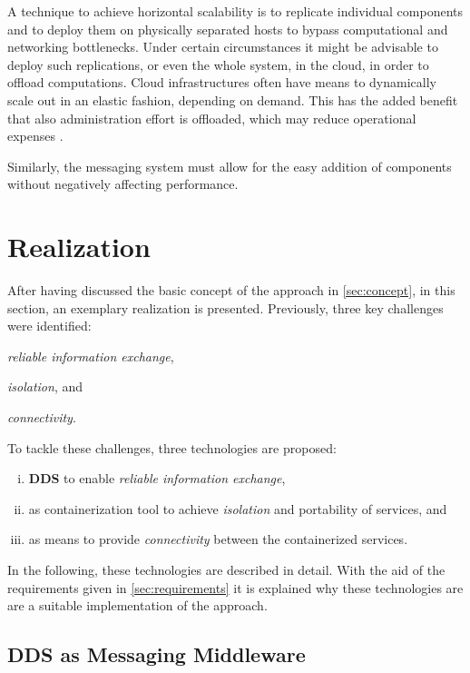A technique to achieve horizontal scalability is to replicate individual components and to deploy them on physically separated hosts to bypass computational and networking bottlenecks. Under certain circumstances it might be advisable to deploy such replications, or even the whole system, in the cloud, in order to offload computations. Cloud infrastructures often have means to dynamically scale out in an elastic fashion, depending on demand. This has the added benefit that also administration effort is offloaded, which may reduce operational expenses \cite{vaquero2011dynamically}.

Similarly, the messaging system must allow for the easy addition of components without negatively affecting performance.

%
%
%
%
%
%
%
%
%
%

\section{Realization} \label{sec:realization}
After having discussed the basic concept of the approach in \autoref{sec:concept}, in this section, an exemplary realization is presented. Previously, three key challenges were identified:
\begin{inparaenum}[(i)]
  \item \emph{reliable information exchange},
  \item \emph{isolation}, and
  \item \emph{connectivity}. 
\end{inparaenum}
To tackle these challenges, three technologies are proposed:

\begin{enumerate}[(i)]
\item \textbf{DDS} to enable \emph{reliable information exchange},
\item \textbf{\docker} as containerization tool to achieve \emph{isolation} and portability of services, and
\item \textbf{\wnet} as means to provide \emph{connectivity} between the containerized services.
\end{enumerate}

In the following, these technologies are described in detail. With the aid of the requirements given in \autoref{sec:requirements} it is explained why these technologies are are a suitable implementation of the  approach. 


\subsection{DDS as Messaging Middleware}


